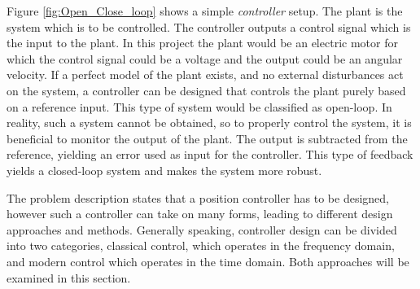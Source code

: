 \documentclass[../../main.tex]{subfiles}
\begin{document}
Figure \ref{fig:Open_Close_loop} shows a simple \textit{controller} setup.
The plant is the system which is to be controlled. The controller outputs a control signal which is the input to the plant. 
In this project the plant would be an electric motor for which the control signal could be a voltage and the output could be an angular velocity.
If a perfect model of the plant exists, and no external disturbances act on the system, a controller can be designed that controls the plant purely based on a reference input. This type of system would be classified as open-loop. In reality, such a system cannot be obtained, so to properly control the system, it is beneficial to monitor the output of the plant. The output is subtracted from the reference, yielding an error used as input for the controller. This type of feedback yields a closed-loop system and makes the system more robust. 

The problem description states that a position controller has to be designed, however such a controller can take on many forms, leading to different design approaches and methods. Generally speaking, controller design can be divided into two categories, classical control, which operates in the frequency domain, and modern control which operates in the time domain. Both approaches will be examined in this section.









\end{document}
